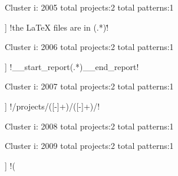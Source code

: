 Cluster i: 2005
total projects:2
total patterns:1
\begin{multicols}{1}
\begin{description}[noitemsep,topsep=0pt]
\item [[2] ] \cverb!the LaTeX files are in (.*)\.!
\end{description}
\end{multicols}







Cluster i: 2006
total projects:2
total patterns:1
\begin{multicols}{1}
\begin{description}[noitemsep,topsep=0pt]
\item [[2] ] \cverb!__start_report(.*)__end_report!
\end{description}
\end{multicols}







Cluster i: 2007
total projects:2
total patterns:1
\begin{multicols}{1}
\begin{description}[noitemsep,topsep=0pt]
\item [[2] ] \cverb!/projects/([-\w]+)/([-\w]+)/!
\end{description}
\end{multicols}







Cluster i: 2008
total projects:2
total patterns:1
\begin{multicols}{1}
\end{multicols}







Cluster i: 2009
total projects:2
total patterns:1
\begin{multicols}{1}
\begin{description}[noitemsep,topsep=0pt]
\item [[2] ] \cverb!(%
\end{description}
\end{multicols}







